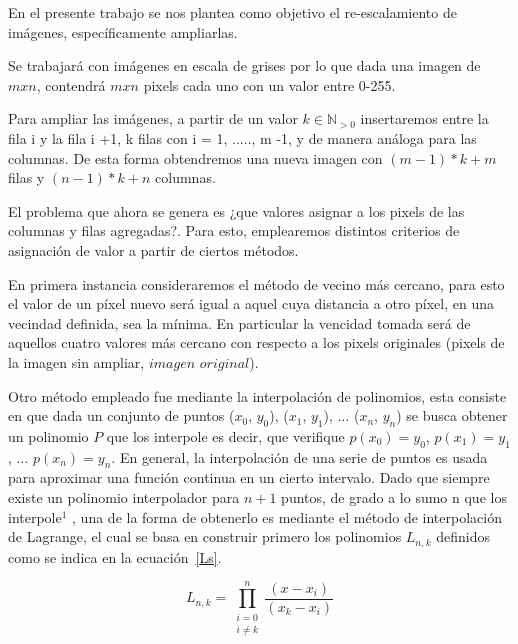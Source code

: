 \documentclass[a4paper]{article}
\newcounter{col}
\begin{document}
En el presente trabajo se nos plantea como objetivo el re-escalamiento de imágenes, específicamente ampliarlas.

Se trabajar\'a con imágenes en escala de grises por lo que dada una imagen de $mxn$, contendrá $mxn$ pixels cada uno con un valor entre 0-255.

Para ampliar las imágenes, a partir de un valor $k \in \mathbb{N}_{>0}$ insertaremos entre la fila i y la fila i +1, k filas con i = 1, ....., m -1, y de manera análoga para las columnas. De esta forma obtendremos una nueva imagen con $(m -1)*k + m$ filas y $(n -1)*k + n$ columnas.

El problema que ahora se genera es ¿que valores asignar a los pixels de las columnas y filas agregadas?. Para esto, emplearemos distintos criterios de asignación de valor a partir de ciertos métodos.

En primera instancia consideraremos el método de vecino m\'as cercano, para esto el valor de un píxel nuevo será igual a aquel cuya distancia a otro píxel, en una vecindad definida, sea la mínima. En particular la vencidad tomada será de aquellos cuatro valores más cercano con respecto a los pixels originales (pixels de la imagen sin ampliar, $imagen$ $original$). 

Otro método empleado fue mediante la interpolación de polinomios, esta consiste en que dada un conjunto de puntos ($ x_{0} $, $ y_{0} $), ($ x_{1} $, $ y_{1} $), $ \ldots $ ($ x_{n} $, $ y_{n} $) se busca obtener un polinomio $P$ que los interpole es decir, que verifique $ p(x_{0}) =  y_{0} $, $ p(x_{1}) =  y_{1} $, $ \ldots $ $ p(x_{n}) =  y_{n} $. En general, la interpolación de una serie de puntos es usada para aproximar una función continua en un cierto intervalo. 
Dado que siempre existe un polinomio interpolador para $n+1$ puntos, de grado a lo sumo n que los interpole$^{1}$ %
, una de la forma de obtenerlo es mediante el método de interpolación de Lagrange, el cual se basa en construir primero los polinomios $ L_{n,k} $ definidos como se indica en la ecuación~\ref{Ls}.

\begin{equation}
L_{n,k}= \prod_{\substack{i=0\\i\neq k}}^{n} \frac{(x-x_{i})}{(x_{k}-x_{i})}
\label{Ls}
\end{equation}
\end{document}
